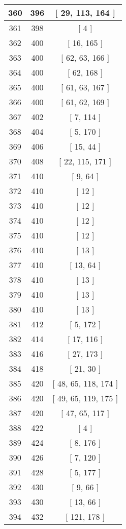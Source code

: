\begin{center}
\begin{longtable}[H]{|| c c c ||}
\hline
360 & 396 & [ 29, 113, 164 ] \\ 
\hline
361 & 398 & [ 4 ] \\ 
\hline
362 & 400 & [ 16, 165 ] \\ 
\hline
363 & 400 & [ 62, 63, 166 ] \\ 
\hline
364 & 400 & [ 62, 168 ] \\ 
\hline
365 & 400 & [ 61, 63, 167 ] \\ 
\hline
366 & 400 & [ 61, 62, 169 ] \\ 
\hline
367 & 402 & [ 7, 114 ] \\ 
\hline
368 & 404 & [ 5, 170 ] \\ 
\hline
369 & 406 & [ 15, 44 ] \\ 
\hline
370 & 408 & [ 22, 115, 171 ] \\ 
\hline
371 & 410 & [ 9, 64 ] \\ 
\hline
372 & 410 & [ 12 ] \\ 
\hline
373 & 410 & [ 12 ] \\ 
\hline
374 & 410 & [ 12 ] \\ 
\hline
375 & 410 & [ 12 ] \\ 
\hline
376 & 410 & [ 13 ] \\ 
\hline
377 & 410 & [ 13, 64 ] \\ 
\hline
378 & 410 & [ 13 ] \\ 
\hline
379 & 410 & [ 13 ] \\ 
\hline
380 & 410 & [ 13 ] \\ 
\hline
381 & 412 & [ 5, 172 ] \\ 
\hline
382 & 414 & [ 17, 116 ] \\ 
\hline
383 & 416 & [ 27, 173 ] \\ 
\hline
384 & 418 & [ 21, 30 ] \\ 
\hline
385 & 420 & [ 48, 65, 118, 174 ] \\ 
\hline
386 & 420 & [ 49, 65, 119, 175 ] \\ 
\hline
387 & 420 & [ 47, 65, 117 ] \\ 
\hline
388 & 422 & [ 4 ] \\ 
\hline
389 & 424 & [ 8, 176 ] \\ 
\hline
390 & 426 & [ 7, 120 ] \\ 
\hline
391 & 428 & [ 5, 177 ] \\ 
\hline
392 & 430 & [ 9, 66 ] \\ 
\hline
393 & 430 & [ 13, 66 ] \\ 
\hline
394 & 432 & [ 121, 178 ] \\ 

\end{longtable}
\end{center}
